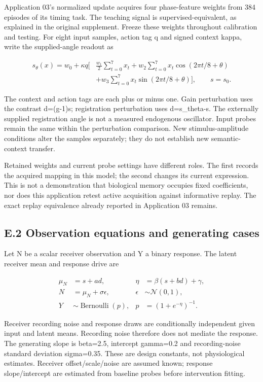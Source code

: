 \documentclass[
  american,
  11pt,
  letterpaper,
]{article}
\begin{document}
Application 03's normalized update acquires four phase-feature weights from 384 episodes of its timing task. The teaching signal is supervised-equivalent, as explained in the original supplement. Freeze these weights throughout calibration and testing. For eight input samples, action tag q and signed context kappa, write the supplied-angle readout as

\[
\begin{aligned}
s_\theta(x)=w_0+\kappa q\bigg[&\frac{w_1}{2}\sum_{t=0}^{7}x_t
 +w_2\sum_{t=0}^{7}x_t\cos(2\pi t/8+\theta)\\
 &+w_3\sum_{t=0}^{7}x_t\sin(2\pi t/8+\theta)\bigg],\qquad s=s_0.
\end{aligned}\tag{E1}
\]

The context and action tags are each plus or minus one. Gain perturbation uses the contrast d=(g-1)s; registration perturbation uses d=s\_theta-s. The externally supplied registration angle is not a measured endogenous oscillator. Input probes remain the same within the perturbation comparison. New stimulus-amplitude conditions alter the samples separately; they do not establish new semantic-context transfer.

Retained weights and current probe settings have different roles. The first records the acquired mapping in this model; the second changes its current expression. This is not a demonstration that biological memory occupies fixed coefficients, nor does this application retest active acquisition against informative replay. The exact replay equivalence already reported in Application 03 remains.

\subsection{E.2 Observation equations and generating cases}\label{e.2-observation-equations-and-generating-cases}

Let N be a scalar receiver observation and Y a binary response. The latent receiver mean and response drive are

\[
\begin{aligned}
\mu_N&=s+a d,& \eta&=\beta(s+b d)+\gamma,\\
N&=\mu_N+\sigma\epsilon,& \epsilon&\sim\mathcal N(0,1),\\
Y&\sim\operatorname{Bernoulli}(p),&p&=(1+e^{-\eta})^{-1}.
\end{aligned}\tag{E2}
\]

Receiver recording noise and response draws are conditionally independent given input and latent means. Recording noise therefore does not mediate the response. The generating slope is beta=2.5, intercept gamma=0.2 and recording-noise standard deviation sigma=0.35. These are design constants, not physiological estimates. Receiver offset/scale/noise are assumed known; response slope/intercept are estimated from baseline probes before intervention fitting.
\end{document}
